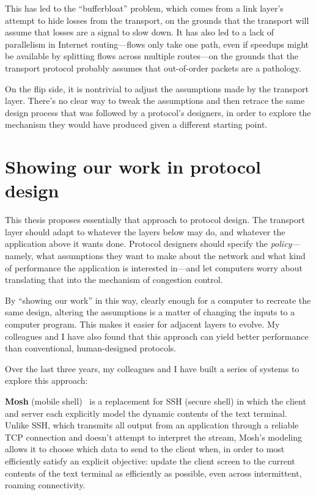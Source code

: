 This has led to the ``bufferbloat''\cite{bufferbloat} problem, which
comes from a link layer's attempt to hide losses from the transport,
on the grounds that the transport will assume that losses are a signal
to slow down. It has also led to a lack of parallelism in Internet
routing---flows only take one path, even if speedups might be
available by splitting flows across multiple routes---on the grounds
that the transport protocol probably assumes that out-of-order packets
are a pathology.

On the flip side, it is nontrivial to adjust the assumptions made by
the transport layer. There's no clear way to tweak the assumptions and
then retrace the same design process that was followed by a protocol's
designers, in order to explore the mechanism they would have produced
given a different starting point.

\section{Showing our work in protocol design}

This thesis proposes essentially that approach to protocol design. The
transport layer should adapt to whatever the layers below may do, and
whatever the application above it wants done. Protocol designers
should specify the \emph{policy}---namely, what assumptions they want
to make about the network and what kind of performance the application
is interested in---and let computers worry about translating that into
the mechanism of congestion control.

By ``showing our work'' in this way, clearly enough for a computer to
recreate the same design, altering the assumptions is a matter of
changing the inputs to a computer program. This makes it easier for
adjacent layers to evolve. My colleagues and I have also found that
this approach can yield better performance than conventional,
human-designed protocols.

Over the last three years, my colleagues and I have built a series of
systems to explore this approach:

\textbf{Mosh} (mobile shell)~\cite{mosh} is a replacement for SSH
(secure shell) in which the client and server each explicitly model
the dynamic contents of the text terminal. Unlike SSH, which transmits all
output from an application through a reliable TCP connection and
doesn't attempt to interpret the stream, Mosh's modeling allows it
to choose which data to send to the client when, in order to most
efficiently satisfy an explicit objective: update the client screen to
the current contents of the text terminal as efficiently as possible,
even across intermittent, roaming connectivity.

